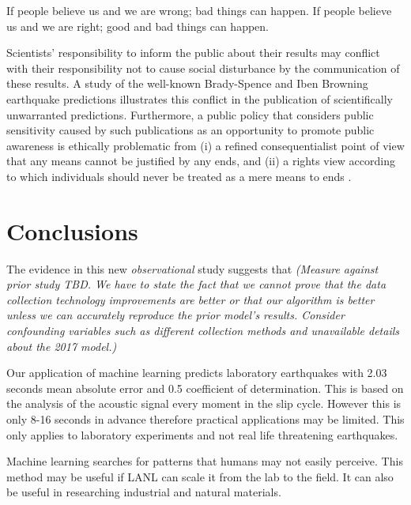 \documentclass[]{llncs}
\begin{document}

If people believe us and we are wrong; bad things can happen. If people believe us and we are right; good and bad things can happen.\par

Scientists’ responsibility to inform the public about their results may conflict with their responsibility not to cause social disturbance by the communication of these results. A study of the well-known Brady-Spence and Iben Browning earthquake predictions illustrates this conflict in the publication of scientifically unwarranted predictions. Furthermore, a public policy that considers public sensitivity caused by such publications as an opportunity to promote public awareness is ethically problematic from (i) a refined consequentialist point of view that any means cannot be justified by any ends, and (ii) a rights view according to which individuals should never be treated as a mere means to ends \cite{Ayhan}.
\section{Conclusions}




The evidence in this new {\em observational} study suggests that {\em (Measure against prior study TBD. We have to state the fact that we cannot prove that the data collection technology improvements are better or that our algorithm is better unless we can accurately reproduce the prior model's results. Consider confounding variables such as different collection methods and unavailable details about the 2017 model.)}\par
Our application of machine learning predicts laboratory earthquakes with 2.03 seconds mean absolute error and 0.5 coefficient of determination. This is based on the analysis of the acoustic signal every moment in the slip cycle. However this is only 8-16 seconds in advance therefore practical applications may be limited. This only applies to laboratory experiments and not real life threatening earthquakes.\par
Machine learning searches for patterns that humans may not easily perceive. This method may be useful if LANL can scale it from the lab to the field. It can also be useful in researching industrial and natural materials.
\par








\end{document}
